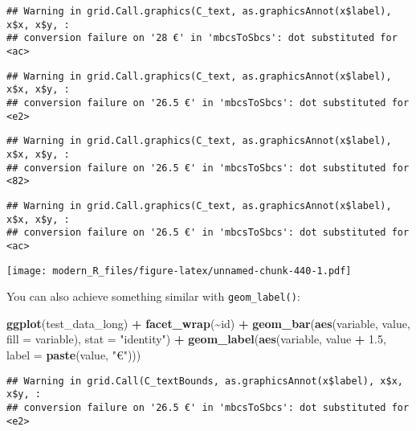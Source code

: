 \documentclass[
]{article}
\newenvironment{Shaded}{\begin{snugshade}}{\end{snugshade}}
\newcommand{\DataTypeTok}[1]{\textcolor[rgb]{0.13,0.29,0.53}{#1}}
\newcommand{\FloatTok}[1]{\textcolor[rgb]{0.00,0.00,0.81}{#1}}
\newcommand{\KeywordTok}[1]{\textcolor[rgb]{0.13,0.29,0.53}{\textbf{#1}}}
\newcommand{\NormalTok}[1]{#1}
\newcommand{\OperatorTok}[1]{\textcolor[rgb]{0.81,0.36,0.00}{\textbf{#1}}}
\newcommand{\StringTok}[1]{\textcolor[rgb]{0.31,0.60,0.02}{#1}}
\begin{document}
\begin{verbatim}
## Warning in grid.Call.graphics(C_text, as.graphicsAnnot(x$label), x$x, x$y, :
## conversion failure on '28 €' in 'mbcsToSbcs': dot substituted for <ac>
\end{verbatim}

\begin{verbatim}
## Warning in grid.Call.graphics(C_text, as.graphicsAnnot(x$label), x$x, x$y, :
## conversion failure on '26.5 €' in 'mbcsToSbcs': dot substituted for <e2>
\end{verbatim}

\begin{verbatim}
## Warning in grid.Call.graphics(C_text, as.graphicsAnnot(x$label), x$x, x$y, :
## conversion failure on '26.5 €' in 'mbcsToSbcs': dot substituted for <82>
\end{verbatim}

\begin{verbatim}
## Warning in grid.Call.graphics(C_text, as.graphicsAnnot(x$label), x$x, x$y, :
## conversion failure on '26.5 €' in 'mbcsToSbcs': dot substituted for <ac>
\end{verbatim}

\texttt{[image: modern\_R\_files/figure-latex/unnamed-chunk-440-1.pdf]}

You can also achieve something similar with \texttt{geom\_label()}:

\begin{Shaded}
\begin{Highlighting}[]
\KeywordTok{ggplot}\NormalTok{(test\_data\_long) }\OperatorTok{+}
\StringTok{  }\KeywordTok{facet\_wrap}\NormalTok{(}\OperatorTok{\textasciitilde{}}\NormalTok{id) }\OperatorTok{+}
\StringTok{  }\KeywordTok{geom\_bar}\NormalTok{(}\KeywordTok{aes}\NormalTok{(variable, value, }\DataTypeTok{fill =}\NormalTok{ variable), }\DataTypeTok{stat =} \StringTok{"identity"}\NormalTok{) }\OperatorTok{+}
\StringTok{  }\KeywordTok{geom\_label}\NormalTok{(}\KeywordTok{aes}\NormalTok{(variable, value }\OperatorTok{+}\StringTok{ }\FloatTok{1.5}\NormalTok{, }\DataTypeTok{label =} \KeywordTok{paste}\NormalTok{(value, }\StringTok{"€"}\NormalTok{)))}
\end{Highlighting}
\end{Shaded}

\begin{verbatim}
## Warning in grid.Call(C_textBounds, as.graphicsAnnot(x$label), x$x, x$y, :
## conversion failure on '26.5 €' in 'mbcsToSbcs': dot substituted for <e2>
\end{verbatim}
\end{document}
